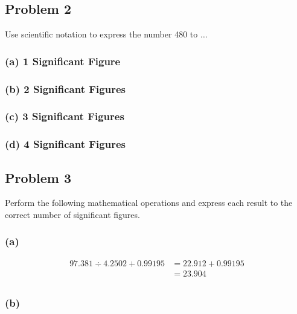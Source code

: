 \documentclass[11pt]{scrartcl}
\begin{document}
\subsection{Problem 2}
Use scientific notation to express the number 480 to $\dots$

\subsubsection{(a) 1 Significant Figure}


\subsubsection{(b) 2 Significant Figures}


\subsubsection{(c) 3 Significant Figures}


\subsubsection{(d) 4 Significant Figures}


\newpage
\subsection{Problem 3}

 Perform the following mathematical operations and express each result to the correct number of significant
figures.

\subsubsection{(a)}

\begin{align*}
    97.381 \div 4.2502 + 0.99195 &= 22.912 + 0.99195 \\
    &= \boxed{23.904} \\
\end{align*}

\subsubsection{(b)}
\end{document}
